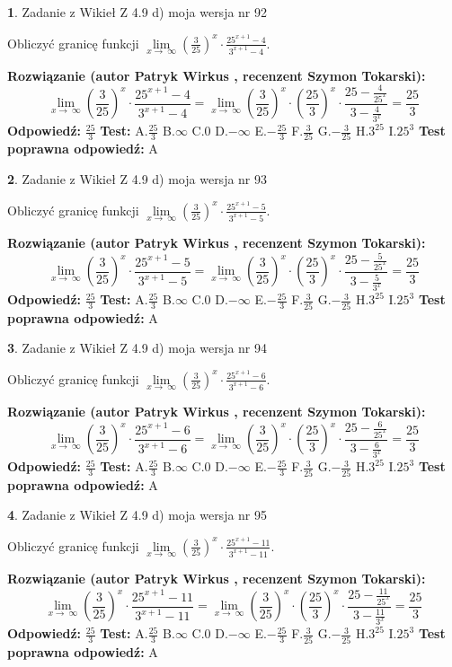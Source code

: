 \documentclass[12pt, a4paper]{article}
\theoremstyle{definition} %
\newtheorem{zad}{}
\newcommand{\zadStart}[1]{\begin{zad}#1\newline}
\newcommand{\zadStop}{\end{zad}}
\newcommand{\rozwStart}[2]{\noindent \textbf{Rozwiązanie (autor #1 , recenzent #2): }\newline}
\newcommand{\rozwStop}{\newline}
\newcommand{\odpStart}{\noindent \textbf{Odpowiedź:}\newline}
\newcommand{\odpStop}{\newline}
\newcommand{\testStart}{\noindent \textbf{Test:}\newline}
\newcommand{\testStop}{\newline}
\newcommand{\kluczStart}{\noindent \textbf{Test poprawna odpowiedź:}\newline}
\newcommand{\kluczStop}{\newline}
\begin{document}
\zadStart{Zadanie z Wikieł Z 4.9 d) moja wersja nr 92}


Obliczyć granicę funkcji  $\lim\limits_{x\to\ \infty}(\frac{3}{25})^{x}\cdot\frac{25^{x+1}-4}{3^{x+1}-4}$.
\zadStop
\rozwStart{Patryk Wirkus}{Szymon Tokarski}
$$\lim\limits_{x\to\ \infty}(\frac{3}{25})^{x}\cdot\frac{25^{x+1}-4}{3^{x+1}-4}=\lim\limits_{x\to\ \infty}(\frac{3}{25})^{x}\cdot(\frac{25}{3})^{x} \cdot \frac{25-\frac{4}{25^{x}}}{3-\frac{4}{3^{x}}} = \frac{25}{3}$$
\rozwStop
\odpStart
$\frac{25}{3}$
\odpStop
\testStart
A.$\frac{25}{3}$ B.$\infty$ C.$0$ D.$-\infty$ E.$-\frac{25}{3}$
F.$\frac{3}{25}$ G.$-\frac{3}{25}$
H.$3^{25}$
I.$25^{3}$
\testStop
\kluczStart
A
\kluczStop



\zadStart{Zadanie z Wikieł Z 4.9 d) moja wersja nr 93}


Obliczyć granicę funkcji  $\lim\limits_{x\to\ \infty}(\frac{3}{25})^{x}\cdot\frac{25^{x+1}-5}{3^{x+1}-5}$.
\zadStop
\rozwStart{Patryk Wirkus}{Szymon Tokarski}
$$\lim\limits_{x\to\ \infty}(\frac{3}{25})^{x}\cdot\frac{25^{x+1}-5}{3^{x+1}-5}=\lim\limits_{x\to\ \infty}(\frac{3}{25})^{x}\cdot(\frac{25}{3})^{x} \cdot \frac{25-\frac{5}{25^{x}}}{3-\frac{5}{3^{x}}} = \frac{25}{3}$$
\rozwStop
\odpStart
$\frac{25}{3}$
\odpStop
\testStart
A.$\frac{25}{3}$ B.$\infty$ C.$0$ D.$-\infty$ E.$-\frac{25}{3}$
F.$\frac{3}{25}$ G.$-\frac{3}{25}$
H.$3^{25}$
I.$25^{3}$
\testStop
\kluczStart
A
\kluczStop



\zadStart{Zadanie z Wikieł Z 4.9 d) moja wersja nr 94}


Obliczyć granicę funkcji  $\lim\limits_{x\to\ \infty}(\frac{3}{25})^{x}\cdot\frac{25^{x+1}-6}{3^{x+1}-6}$.
\zadStop
\rozwStart{Patryk Wirkus}{Szymon Tokarski}
$$\lim\limits_{x\to\ \infty}(\frac{3}{25})^{x}\cdot\frac{25^{x+1}-6}{3^{x+1}-6}=\lim\limits_{x\to\ \infty}(\frac{3}{25})^{x}\cdot(\frac{25}{3})^{x} \cdot \frac{25-\frac{6}{25^{x}}}{3-\frac{6}{3^{x}}} = \frac{25}{3}$$
\rozwStop
\odpStart
$\frac{25}{3}$
\odpStop
\testStart
A.$\frac{25}{3}$ B.$\infty$ C.$0$ D.$-\infty$ E.$-\frac{25}{3}$
F.$\frac{3}{25}$ G.$-\frac{3}{25}$
H.$3^{25}$
I.$25^{3}$
\testStop
\kluczStart
A
\kluczStop



\zadStart{Zadanie z Wikieł Z 4.9 d) moja wersja nr 95}


Obliczyć granicę funkcji  $\lim\limits_{x\to\ \infty}(\frac{3}{25})^{x}\cdot\frac{25^{x+1}-11}{3^{x+1}-11}$.
\zadStop
\rozwStart{Patryk Wirkus}{Szymon Tokarski}
$$\lim\limits_{x\to\ \infty}(\frac{3}{25})^{x}\cdot\frac{25^{x+1}-11}{3^{x+1}-11}=\lim\limits_{x\to\ \infty}(\frac{3}{25})^{x}\cdot(\frac{25}{3})^{x} \cdot \frac{25-\frac{11}{25^{x}}}{3-\frac{11}{3^{x}}} = \frac{25}{3}$$
\rozwStop
\odpStart
$\frac{25}{3}$
\odpStop
\testStart
A.$\frac{25}{3}$ B.$\infty$ C.$0$ D.$-\infty$ E.$-\frac{25}{3}$
F.$\frac{3}{25}$ G.$-\frac{3}{25}$
H.$3^{25}$
I.$25^{3}$
\testStop
\kluczStart
A
\kluczStop
\end{document}
